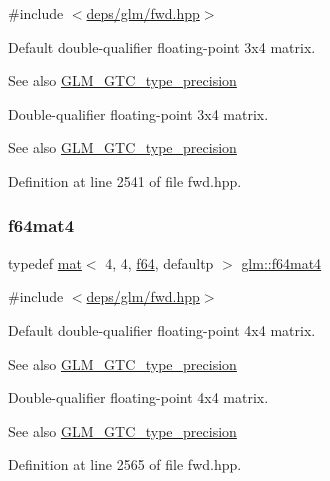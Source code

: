 {\ttfamily \#include $<$\hyperlink{fwd_8hpp}{deps/glm/fwd.\+hpp}$>$}

Default double-\/qualifier floating-\/point 3x4 matrix. \begin{DoxySeeAlso}{See also}
\hyperlink{group__gtc__type__precision}{G\+L\+M\+\_\+\+G\+T\+C\+\_\+type\+\_\+precision}
\end{DoxySeeAlso}
Double-\/qualifier floating-\/point 3x4 matrix. \begin{DoxySeeAlso}{See also}
\hyperlink{group__gtc__type__precision}{G\+L\+M\+\_\+\+G\+T\+C\+\_\+type\+\_\+precision} 
\end{DoxySeeAlso}


Definition at line 2541 of file fwd.\+hpp.

\mbox{\label{group__gtc__type__precision_ga9dfc41169318c3a9ca532e087c7641e9}} 
\subsubsection{\texorpdfstring{f64mat4}{f64mat4}}
{\footnotesize\ttfamily typedef \hyperlink{structglm_1_1mat}{mat}$<$ 4, 4, \hyperlink{group__gtc__type__precision_ga2bba392e555124b36cde6abba349bab3}{f64}, defaultp $>$ \hyperlink{group__gtc__type__precision_ga9dfc41169318c3a9ca532e087c7641e9}{glm\+::f64mat4}}



{\ttfamily \#include $<$\hyperlink{fwd_8hpp}{deps/glm/fwd.\+hpp}$>$}

Default double-\/qualifier floating-\/point 4x4 matrix. \begin{DoxySeeAlso}{See also}
\hyperlink{group__gtc__type__precision}{G\+L\+M\+\_\+\+G\+T\+C\+\_\+type\+\_\+precision}
\end{DoxySeeAlso}
Double-\/qualifier floating-\/point 4x4 matrix. \begin{DoxySeeAlso}{See also}
\hyperlink{group__gtc__type__precision}{G\+L\+M\+\_\+\+G\+T\+C\+\_\+type\+\_\+precision} 
\end{DoxySeeAlso}


Definition at line 2565 of file fwd.\+hpp.

\mbox{\label{group__gtc__type__precision_ga704001c2ed5838498ff61f55995fed3a}} 
